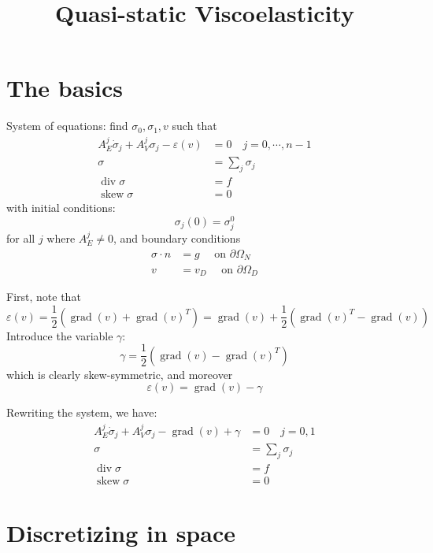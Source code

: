 \documentclass{amsart}
\DeclareMathOperator{\Div}{div}
\DeclareMathOperator{\Grad}{grad}
\DeclareMathOperator{\Skew}{skew}
\begin{document}
\title{Quasi-static Viscoelasticity}
\maketitle

\section{The basics}

System of equations: find $\sigma_0, \sigma_1, v$ such that
\begin{align}
  A_E^{j} \dot \sigma_j + A_{V}^{j} \sigma_j - \varepsilon(v) &= 0
  \quad j = 0, \cdots, n-1 \\
  \sigma &= \sum_{j} \sigma_j \\
  \Div \sigma & = f \\
  \Skew \sigma &= 0
\end{align}
with initial conditions:
\begin{equation}
  \sigma_j(0) = \sigma_j^0
\end{equation}
for all $j$ where $A_E^{j} \not = 0$, and boundary conditions
\begin{align}
  \sigma \cdot n &= g \quad \text{ on } \partial \Omega_N \\
  v &= v_{D} \quad \text{ on } \partial \Omega_D
\end{align}

First, note that
\begin{equation}
  \varepsilon(v) = \frac{1}{2} (\Grad(v) + \Grad(v)^T)
  = \Grad(v) + \frac{1}{2}(\Grad(v)^T - \Grad(v))
\end{equation}
Introduce the variable $\gamma$:
\begin{equation}
  \gamma = \frac{1}{2}(\Grad(v) - \Grad(v)^T)
\end{equation}
which is clearly skew-symmetric, and moreover
\begin{equation}
  \varepsilon(v) = \Grad(v) - \gamma
\end{equation}

Rewriting the system, we have:
\begin{align}
  A_E^{j} \dot \sigma_j + A_{V}^{j} \sigma_j - \Grad(v) + \gamma &= 0
  \quad j = 0, 1 \\
  \sigma &= \sum_{j} \sigma_j \\
  \Div \sigma & = f \\
  \Skew \sigma &= 0
\end{align}

\section{Discretizing in space}
\end{document}
